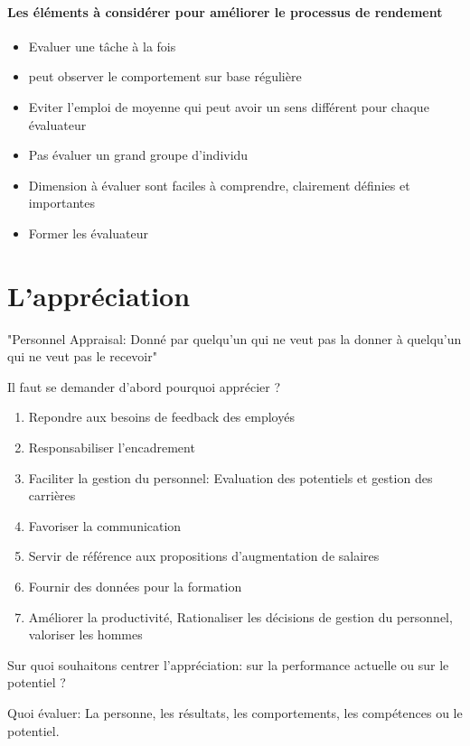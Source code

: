 \paragraph{Les éléments à considérer pour améliorer le processus de rendement}
\begin{itemize}
    \item Evaluer une tâche à la fois
    \item peut observer le comportement sur base régulière
    \item Eviter l'emploi de moyenne qui peut avoir un sens différent pour chaque évaluateur
    \item Pas évaluer un grand groupe d'individu
    \item Dimension à évaluer sont faciles à comprendre, clairement définies et importantes
    \item Former les évaluateur
    
\end{itemize}


\section{L'appréciation} \cite{gestionressourceshumaine2007}

"Personnel Appraisal: Donné par quelqu'un qui ne veut pas la donner à quelqu'un qui ne veut pas le recevoir"

Il faut se demander d'abord pourquoi apprécier ? 
\begin{enumerate}
    \item Repondre aux besoins de feedback des employés
    \item Responsabiliser l'encadrement
    \item Faciliter la gestion du personnel: Evaluation des potentiels et gestion des carrières
    \item Favoriser la communication
    \item Servir de référence aux propositions d'augmentation de salaires
    \item Fournir des données pour la formation
    \item Améliorer la productivité, Rationaliser les décisions de gestion du personnel, valoriser les hommes
\end{enumerate} 

Sur quoi souhaitons centrer l'appréciation: sur la performance actuelle ou sur le potentiel ? 

Quoi évaluer: La personne, les résultats, les comportements, les compétences ou le potentiel. 

